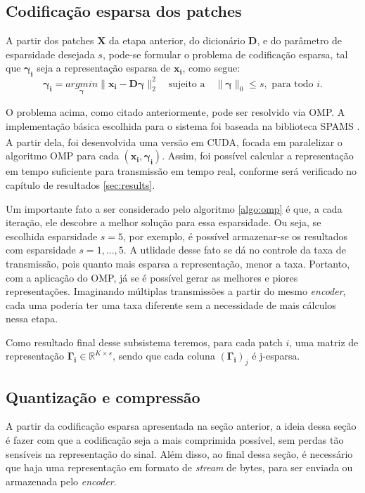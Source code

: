 \documentclass[cic,tc]{iiufrgs}
\renewcommand{\vec}[1]{\bm{#1}}
\newcommand{\mat}[1]{\bm{#1}}
\newcommand{\reg}{\textsuperscript{\textregistered}}
\begin{document}
\subsection{Codificação esparsa dos patches}
A partir dos patches $\mat{X}$ da etapa anterior, do dicionário $\mat{D}$, e do parâmetro 
de esparsidade desejada $s$, pode-se formular o problema de codificação esparsa, tal que 
$\vec{\gamma_i}$ seja a representação esparsa de $\vec{x_i}$, como segue:
\begin{equation}
    \vec{\gamma_i} = \underset{\vec{\gamma}}{argmin} \lVert \vec{x_i} - \mat{D}\vec{\gamma} \rVert_2^2
    \hspace{1em} \text{sujeito a} \hspace{1em}
    \lVert \vec{\gamma} \rVert_0 \le s,
    \text{ para todo } i.
\end{equation}

O problema acima, como citado anteriormente, pode ser resolvido via OMP.
A implementação básica escolhida para o sistema foi baseada na biblioteca SPAMS \cite{SPAMS}.
A partir dela, foi desenvolvida uma versão em CUDA\reg, focada em paralelizar o algoritmo
OMP para cada $(\vec{x_i}, \vec{\gamma_i})$. Assim, foi possível calcular a representação
em tempo suficiente para transmissão em tempo real, conforme será verificado no capítulo 
de resultados \autoref{sec:results}.

Um importante fato a ser considerado pelo algoritmo \autoref{algo:omp} é que, a cada iteração,
ele descobre a melhor solução para essa esparsidade. Ou seja, se escolhida esparsidade $s=5$,
por exemplo, é possível armazenar-se os resultados com esparsidade $s=1,...,5$. 
A utlidade desse fato se dá no controle da taxa de transmissão, pois quanto mais esparsa a 
representação, menor a taxa. 
Portanto, com a aplicação do OMP, já se é possível gerar as melhores e piores representações.
Imaginando múltiplas transmissões a partir do mesmo \textit{encoder}, cada uma poderia ter 
uma taxa diferente sem a necessidade de mais cálculos nessa etapa.

Como resultado final desse subsistema teremos, para cada patch $i$, uma matriz de representação
$\mat{\Gamma_i} \in \mathbb{R}^{K \times s}$, sendo que cada coluna $(\mat{\Gamma_i})_j$ é 
j-esparsa.

\subsection{Quantização e compressão}
A partir da codificação esparsa apresentada na seção anterior, a ideia dessa seção é 
fazer com que a codificação seja a mais comprimida possível, sem perdas tão sensíveis
na representação do sinal.
Além disso, ao final dessa seção, é necessário que haja uma representação em formato de 
\textit{stream} de bytes, para ser enviada ou armazenada pelo \textit{encoder}.
\end{document}
